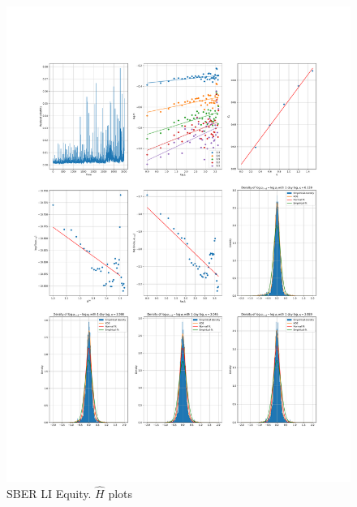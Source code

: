     \begin{figure}[h]
        \centering
        \includegraphics[width=\textwidth]{fig/SBER LI Equity.pdf}
        \caption{SBER LI Equity. $\hat{H}$ plots}
    \end{figure} 

